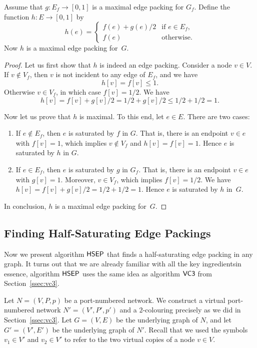 \begin{lemma}\label{lem:half-sat-complete}
    Assume that $g\colon E_f \to [0,1]$ is a maximal edge packing for $G_f$. Define the function $h\colon E \to [0,1]$ by
    \[
        h(e) = \begin{cases}
            f(e) + g(e)/2 & \text{if } e \in E_f, \\
            f(e) & \text{otherwise}.
        \end{cases}
    \]
    Now $h$ is a maximal edge packing for~$G$.
\end{lemma}
\begin{proof}
    Let us first show that $h$ is indeed an edge packing. Consider a node $v \in V$. If $v \notin V_f$, then $v$ is not incident to any edge of $E_f$, and we have
    \[
        h[v] = f[v] \le 1.
    \]
    Otherwise $v \in V_f$, in which case $f[v] = 1/2$. We have
    \[
        h[v] = f[v] + g[v]/2 = 1/2 + g[v]/2 \le 1/2 + 1/2 = 1.
    \]
    
    Now let us prove that $h$ is maximal. To this end, let $e \in E$. There are two cases:
    \begin{enumerate}
        \item If $e \notin E_f$, then $e$ is saturated by $f$ in $G$. That is, there is an endpoint $v \in e$ with $f[v] = 1$, which implies $v \notin V_f$ and $h[v] = f[v] = 1$. Hence $e$ is saturated by $h$ in $G$.
        \item If $e \in E_f$, then $e$ is saturated by $g$ in $G_f$. That is, there is an endpoint $v \in e$ with $g[v] = 1$. Moreover, $v \in V_f$, which implies $f[v] = 1/2$. We have $h[v] = f[v] + g[v]/2 = 1/2 + 1/2 = 1$. Hence $e$ is saturated by $h$ in~$G$.
    \end{enumerate}
    In conclusion, $h$ is a maximal edge packing for~$G$.
\end{proof}


\subsection{Finding Half-Saturating Edge Packings}\label{ssec:hsep}

Now we present algorithm $\textsf{HSEP}$ that finds a half-saturating edge packing in any graph. It turns out that we are already familiar with all the key ingredients\mydash in essence, algorithm $\textsf{HSEP}$ uses the same idea as algorithm $\textsf{VC3}$ from Section~\ref{ssec:vc3}.

Let $N = (V,P,p)$ be a port-numbered network. We construct a virtual port-numbered network $N' = (V'\!,P'\!,p')$ and a $2$-colouring precisely as we did in Section~\ref{ssec:vc3}. Let $G = (V,E)$ be the underlying graph of $N$, and let $G' = (V'\!,E')$ be the underlying graph of $N'$. Recall that we used the symbols $v_1 \in V'$ and $v_2 \in V'$ to refer to the two virtual copies of a node $v \in V$.

